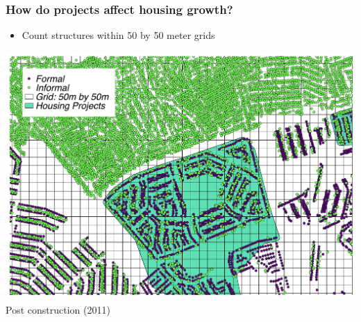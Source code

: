 \documentclass[aspectratio=149]{beamer}
\begin{document}
% 


\begin{frame}
\frametitle{How do projects affect housing growth?}
\begin{itemize}
  \item Count structures within 50 by 50 meter grids
\end{itemize}
\begin{center}
\includegraphics[scale=0.31]{bblu_map.pdf}\\
Post construction (2011)
\vspace{-3mm}
\end{center}
\end{frame}





\end{document}
